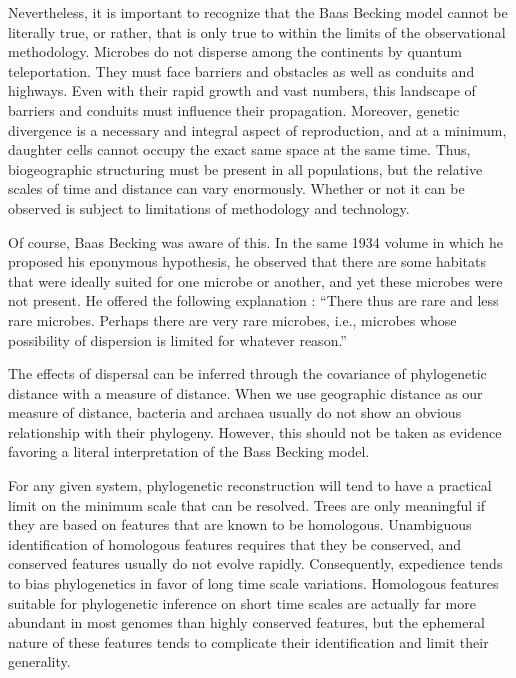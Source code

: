 Nevertheless, it is important to recognize that the Baas Becking model cannot be literally true, or rather, that is only true to within the limits of the observational methodology. Microbes do not disperse among the continents by quantum teleportation. They must face barriers and obstacles as well as conduits and highways. Even with their rapid growth and vast numbers, this landscape of barriers and conduits must influence their propagation. Moreover, genetic divergence is a necessary and integral aspect of reproduction, and at a minimum, daughter cells cannot occupy the exact same space at the same time. Thus, biogeographic structuring must be present in all populations, but the relative scales of time and distance can vary enormously. Whether or not it can be observed is subject to limitations of methodology and technology.

Of course, Baas Becking was aware of this. In the same 1934 volume in which he proposed his eponymous hypothesis, he observed that there are some habitats that were ideally suited for one microbe or another, and yet these microbes were not present. He offered the following explanation : ``There thus are rare and less rare microbes. Perhaps there are very rare microbes, i.e., microbes whose possibility of dispersion is limited for whatever reason.''

The effects of dispersal can be inferred through the covariance of phylogenetic distance with a measure of distance. When we use geographic distance as our measure of distance, bacteria and archaea usually do not show an obvious relationship with their phylogeny. However, this should not be taken as evidence favoring a literal interpretation of the Bass Becking model.

For any given system, phylogenetic reconstruction will tend to have a practical limit on the minimum scale that can be resolved. Trees are only meaningful if they are based on features that are known to be homologous. Unambiguous identification of homologous features requires that they be conserved, and conserved features usually do not evolve rapidly. Consequently, expedience tends to bias phylogenetics in favor of long time scale variations. Homologous features suitable for phylogenetic inference on short time scales are actually far more abundant in most genomes than highly conserved features, but the ephemeral nature of these features tends to complicate their identification and limit their generality. 

